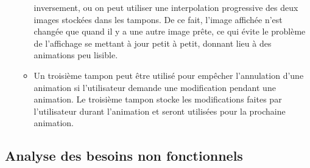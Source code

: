 \documentclass[12pt]{article}
\begin{document}
\begin{itemize}
\begin{itemize}
	inversement, ou on peut utiliser une interpolation progressive des deux images stockées dans les tampons. De ce fait, l'image affichée n'est changée
	que quand il y a une autre image prête, ce qui évite le problème de l'affichage se mettant à jour petit à petit, donnant lieu à des animations peu
	lisible.
	\item Un troisième tampon peut être utilisé pour empêcher l'annulation d'une animation si l'utilisateur demande une modification pendant une
	animation. Le troisième tampon stocke les modifications faites par l'utilisateur durant l'animation et seront utilisées pour la prochaine animation.
	\end{itemize}
\end{itemize}  



\subsection{Analyse des besoins non fonctionnels}
\end{document}
